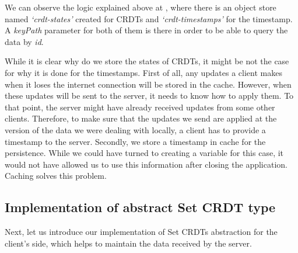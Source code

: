 We can observe the logic explained above at , where there is an object store named \textit{`crdt-states'} created for CRDTs and \textit{`crdt-timestamps'} for the timestamp. A \textit{keyPath} parameter for both of them is there in order to be able to query the data by \textit{id}. 

While it is clear why do we store the states of CRDTs, it might be not the case for why it is done for the timestamps. First of all, any updates a client makes when it loses the internet connection will be stored in the cache. However, when these updates will be sent to the server, it needs to know how to apply them. To that point, the server might have already received updates from some other clients. Therefore, to make sure that the updates we send are applied at the version of the data we were dealing with locally, a client has to provide a timestamp to the server. Secondly, we store a timestamp in cache for the persistence. While we could have turned to creating a variable for this case, it would not have allowed us to use this information after closing the application. Caching solves this problem.

\subsection*{Implementation of abstract Set CRDT type}

Next, let us introduce our implementation of Set CRDTs abstraction for the client's side, which helps to maintain the data received by the server.

